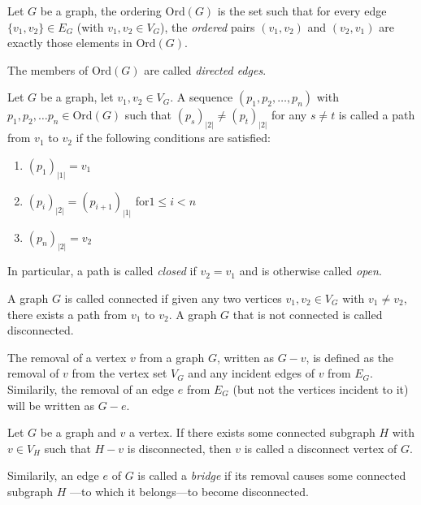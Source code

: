 \documentclass[twoside]{article}
\newenvironment{definition}[1][Definition]{\begin{trivlist}
\item[\hskip \labelsep {\bfseries #1}]}{\end{trivlist}}
\begin{document}
\begin{definition}[Ordering of a Graph]

Let $ G $ be a graph, the ordering $ \mbox{Ord}(G) $ is the set such that for every edge $ \{v_1, v_2\}\in E_G $ (with
$ v_1, v_2\in V_G $), the \emph{ordered} pairs $ (v_1, v_2) $ and $ (v_2, v_1) $ are exactly those elements in
$ \mbox{Ord}(G) $.

\end{definition}
The members of $ \mbox{Ord}(G) $ are called \emph{directed edges}.

\begin{definition}[Path]

Let $ G $ be a graph, let $ v_1, v_2\in V_G $.  A sequence $ (p_1, p_2,\ldots, p_n ) $
with $ p_1, p_2,\ldots p_n\in\mbox{Ord}(G) $ such that $ (p_s)_{|2|}\neq (p_t)_{|2|} $
for any $ s\neq t $ is called a path from $ v_1 $ to $ v_2 $ if the following conditions
are satisfied: 

\begin{enumerate}

\item $ (p_1)_{|1|}=v_1 $

\item $ (p_i)_{|2|}=(p_{i+1})_{|1|} $ \quad for\quad $ 1\le i < n $

\item $ (p_n)_{|2|}=v_2 $

\end{enumerate}

In particular, a path is called \emph{closed} if $ v_2=v_1 $ and is otherwise called \emph{open}.

\end{definition}

\begin{definition}[Connected Graph]

A graph $ G $ is called connected if given any two vertices $ v_1, v_2\in V_G $ with $ v_1\neq v_2 $,
there exists a path from $ v_1 $ to $ v_2 $.  A graph $ G $ that is not connected is called disconnected.

\end{definition}
The removal of a vertex $ v $ from a graph $ G $, written as $ G-v $, is defined as the removal of $ v $ from
the vertex set $ V_G $ and any incident edges of $ v $ from $ E_G $.  Similarily, the removal of an edge $ e $
from $ E_G $ (but not the vertices incident to it) will be written as $ G-e $.

\begin{definition}[Disconnect Vertex]

Let $ G $ be a graph and $ v $ a vertex.  If there exists some connected subgraph $ H $ with $ v\in V_H $ such that
$ H-v $ is disconnected, then $ v $ is called a disconnect vertex of $ G $.

\end{definition}
Similarily, an edge $ e $ of $ G $ is called a \emph{bridge} if its removal causes some connected subgraph $ H $
---to which it belongs---to become disconnected.
\end{document}
